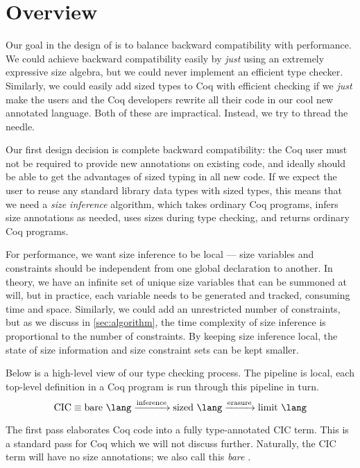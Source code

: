 \section{Overview}\label{sec:sponge-cake}
Our goal in the design of \lang is to balance backward compatibility with performance.
We could achieve backward compatibility easily by \emph{just} using an extremely expressive size algebra, but we could never implement an efficient type checker.
Similarly, we could easily add sized types to Coq with efficient checking if we \emph{just} make the users and the Coq developers rewrite all their code in our cool new annotated language.
Both of these are impractical.
Instead, we try to thread the needle.

Our first design decision is complete backward compatibility: the Coq user must not be required to provide new annotations on existing code, and ideally should be able to get the advantages of sized typing in all new code.
If we expect the user to reuse any standard library data types with sized types, this means that we need a \emph{size inference} algorithm, which takes ordinary Coq programs, infers size annotations as needed, uses sizes during type checking, and returns ordinary Coq programs.

For performance, we want size inference to be local --- size variables and constraints should be independent from one global declaration to another.
In theory, we have an infinite set of unique size variables that can be summoned at will, but in practice, each variable needs to be generated and tracked, consuming time and space.
Similarly, we could add an unrestricted number of constraints, but as we discuss in \autoref{sec:algorithm}, the time complexity of size inference is proportional to the number of constraints.
By keeping size inference local, the state of size information and size constraint sets can be kept smaller.

Below is a high-level view of our type checking process.
The pipeline is local, \ie each top-level definition in a Coq program is run through this pipeline in turn.
\begin{equation*}
  \text{CIC} \equiv \text{bare \lang} \xrightarrow{\text{inference}} \text{sized \lang} \xrightarrow{\text{erasure}} \text{limit \lang}
\end{equation*}

The first pass elaborates Coq code into a fully type-annotated CIC term.
This is a standard pass for Coq which we will not discuss further.
Naturally, the CIC term will have no size annotations; we also call this \emph{bare} \lang.

